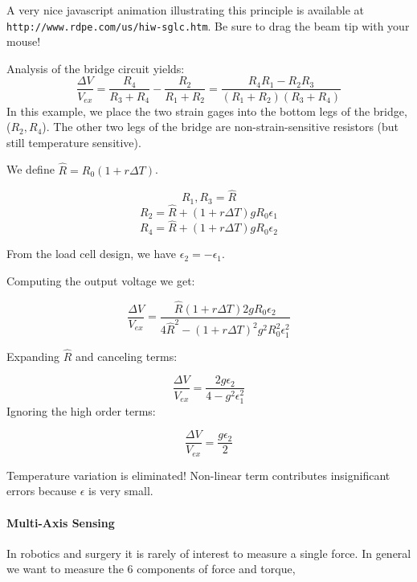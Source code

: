 
A very nice javascript animation illustrating this principle is available at
{\tt http://www.rdpe.com/us/hiw-sglc.htm}.  Be sure to drag the beam tip with your mouse!


Analysis of the bridge circuit yields:
\[
\frac{\Delta V}{V_{ex}} =
\frac{R_4}{R_3 + R_4} - \frac{R_2}{R_1+R_2} =
\frac{R_4R_1 - R_2R_3}{(R_1+R_2)(R_3+R_4)}
\]
In this example, we place the two strain gages into the bottom legs
of the bridge, ($R_2,R_4$).  The other two legs of the bridge are
non-strain-sensitive resistors (but still temperature sensitive).

We define $\hat{R} = R_0(1+r\Delta T)$.

\[
R_1,R_3 = \hat{R}
\]
\[
R_2 = \hat{R} + (1 + r\Delta T)g R_0 \epsilon_1
\]
\[
R_4 = \hat{R} + (1 + r\Delta T)g R_0 \epsilon_2
\]

From the load cell design, we have $\epsilon_2 = - \epsilon_1$.


Computing the output voltage we get:

\[
\frac{\Delta V}{V_{ex}} = \frac{\hat{R}(1+r\Delta T)2gR_0\epsilon_2}
{4\hat{R}^2-(1+r\Delta T)^2 g^2 R_0^2 \epsilon_1^2}
\]



Expanding $\hat{R}$ and  canceling terms:

\[
\frac{\Delta V}{V_{ex}} = \frac{2g\epsilon_2}{4-g^2\epsilon_1^2}
\]
Ignoring the high order terms:

\[
\frac{\Delta V}{V_{ex}} = \frac{g\epsilon_2}{2}
\]

Temperature variation is eliminated!  Non-linear term contributes
insignificant errors because $\epsilon$ is very small.


\paragraph{Multi-Axis Sensing}
In robotics and surgery it is rarely of interest to measure a
single force. In general we want to measure the
6 components of force and torque,


